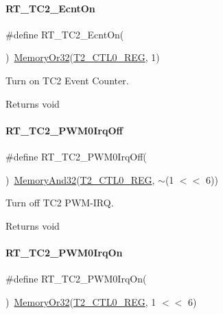 \paragraph{\texorpdfstring{R\+T\+\_\+\+T\+C2\+\_\+\+Ecnt\+On}{RT\_TC2\_EcntOn}}
{\footnotesize\ttfamily \#define R\+T\+\_\+\+T\+C2\+\_\+\+Ecnt\+On(\begin{DoxyParamCaption}{ }\end{DoxyParamCaption})~\mbox{\hyperlink{a00026_a27874a97deab7cecdde5ddecf466e31e}{Memory\+Or32}}(\mbox{\hyperlink{a00026_a5853553391e986211306d4f29ab31e47}{T2\+\_\+\+C\+T\+L0\+\_\+\+R\+EG}}, 1)}



Turn on T\+C2 Event Counter. 

\begin{DoxyReturn}{Returns}
void 
\end{DoxyReturn}
\mbox{\label{a00083_aa5878518a5c2f7b419de8ed259b54e75}} 
\paragraph{\texorpdfstring{R\+T\+\_\+\+T\+C2\+\_\+\+P\+W\+M0\+Irq\+Off}{RT\_TC2\_PWM0IrqOff}}
{\footnotesize\ttfamily \#define R\+T\+\_\+\+T\+C2\+\_\+\+P\+W\+M0\+Irq\+Off(\begin{DoxyParamCaption}{ }\end{DoxyParamCaption})~\mbox{\hyperlink{a00026_ad87cedffcaadc51db22594fce55173d4}{Memory\+And32}}(\mbox{\hyperlink{a00026_a5853553391e986211306d4f29ab31e47}{T2\+\_\+\+C\+T\+L0\+\_\+\+R\+EG}}, $\sim$(1 $<$$<$ 6))}



Turn off T\+C2 P\+W\+M-\/\+I\+RQ. 

\begin{DoxyReturn}{Returns}
void 
\end{DoxyReturn}
\mbox{\label{a00083_a20ca153421087b763d5a1bcec1f90d55}} 
\paragraph{\texorpdfstring{R\+T\+\_\+\+T\+C2\+\_\+\+P\+W\+M0\+Irq\+On}{RT\_TC2\_PWM0IrqOn}}
{\footnotesize\ttfamily \#define R\+T\+\_\+\+T\+C2\+\_\+\+P\+W\+M0\+Irq\+On(\begin{DoxyParamCaption}{ }\end{DoxyParamCaption})~\mbox{\hyperlink{a00026_a27874a97deab7cecdde5ddecf466e31e}{Memory\+Or32}}(\mbox{\hyperlink{a00026_a5853553391e986211306d4f29ab31e47}{T2\+\_\+\+C\+T\+L0\+\_\+\+R\+EG}}, 1 $<$$<$ 6)}



